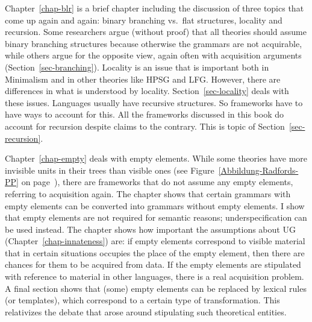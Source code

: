 Chapter~\ref{chap-blr} is a brief chapter including the discussion of three topics that come up
again and again: binary branching vs.\ flat structures, locality and recursion. Some researchers
argue (without proof) that all theories should assume binary branching structures because otherwise
the grammars are not acquirable, while others argue for the opposite view, again often with acquisition
arguments (Section~\ref{sec-branching}). Locality is an issue that is important both in Minimalism and in other theories like HPSG
and LFG. However, there are differences in what is understood by
locality. Section~\ref{sec-locality} deals with these issues. Languages usually have recursive
structures. So frameworks have to have ways to account for this. All the frameworks discussed in
this book do account for recursion despite claims to the contrary. This is topic of
Section~\ref{sec-recursion}.

Chapter~\ref{chap-empty} deals with empty elements. While some theories have more invisible units
in their trees than visible ones (see Figure~\ref{Abbildung-Radfords-PP} on
page~\pageref{Abbildung-Radfords-PP}), there are frameworks that do not assume any empty elements,
referring to acquisition again. The chapter shows that certain grammars with empty elements can be
converted into grammars without empty elements. I show that empty elements are not required for
semantic reasons; underspecification can be used instead. The chapter shows how important the assumptions
about UG (Chapter~\ref{chap-innateness}) are: if empty elements correspond to visible material that
in certain situations occupies the place of the empty element, then there are chances for them to be
acquired from data. If the empty elements are stipulated with reference to material in other
languages, there is a real acquisition problem. A final section shows that (some) empty elements can
be replaced by lexical rules (or templates), which correspond to a certain type of
transformation. This relativizes the debate that arose around stipulating such theoretical entities.
 
